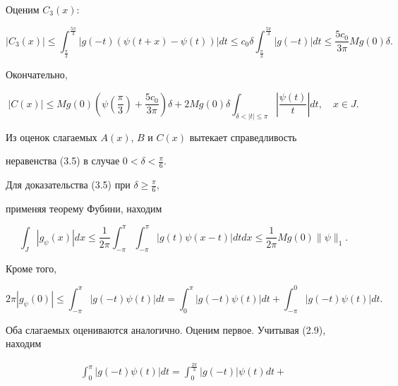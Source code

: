 \begin{pf}
Оценим $C_3(x)$:


$$


|C_3(x)|\le


\int_{\frac{\pi}{3}}^{\frac{5\pi}{3}}|g(-t)(\psi(t+x)-\psi(t))|dt\le


c_0\delta\int_{\frac{\pi}{3}}^{\frac{5\pi}{3}}|g(-t)|dt\le


\frac{5c_0}{3\pi}Mg(0)\delta.


$$


Окончательно,


$$


|C(x)|\le Mg(0)\left(\psi\left(\frac{\pi}{3}\right)


+\frac{5c_0}{3\pi}\right)


\delta+2Mg(0)\delta\int_{\delta<|t|\le\pi}\left|\frac{\psi(t)}{t}\right|dt,


\quad x\in J.


$$





Из оценок слагаемых $A(x)$, $B$ и $C(x)$ вытекает справедливость


неравенства (3.5) в случае $0<\delta<\frac{\pi}{6}$.





Для доказательства (3.5) при $\delta\ge\frac{\pi}{6}$,


применяя теорему Фубини, находим


\begin{equation}


\int_J|g_\psi(x)|dx\le\frac{1}{2\pi}\int_{-\pi}^\pi\int_{-\pi}^\pi


|g(t)\psi(x-t)|dtdx\le\frac{1}{2\pi}Mg(0)\|\psi\|_1.


\end{equation}


Кроме того,


$$


2\pi|g_\psi(0)|\le\int_{-\pi}^\pi|g(-t)\psi(t)|dt


=\int_0^\pi|g(-t)\psi(t)|dt+\int_{-\pi}^0|g(-t)\psi(t)|dt.


$$


Оба слагаемых оцениваются аналогично. Оценим первое. Учитывая (2.9), находим


\begin{multline*}


\int_0^\pi|g(-t)\psi(t)|dt=


\int_0^{\frac{2\pi}{3}}|g(-t)|\psi(t)dt+



\end{multline*}
\end{pf}
